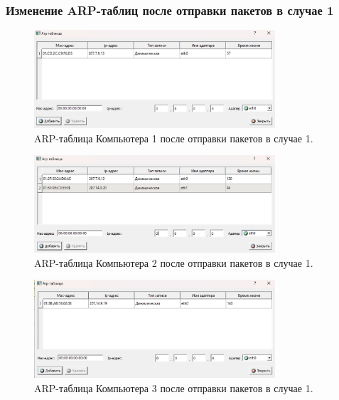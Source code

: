 \documentclass[12pt,onecolumn]{article}
\begin{document}
\subsubsection{Изменение ARP-таблиц после отправки пакетов в случае 1}
\begin{figure}[H]
  \centering
  \includegraphics[width=0.8\textwidth]{image/part3/arp-1-1.png}
  \caption{ARP-таблица Компьютера 1 после отправки пакетов в случае 1.}
\end{figure}
\begin{figure}[H]
  \centering
  \includegraphics[width=0.8\textwidth]{image/part3/arp-1-2.png}
  \caption{ARP-таблица Компьютера 2 после отправки пакетов в случае 1.}
\end{figure}
\begin{figure}[H]
  \centering
  \includegraphics[width=0.8\textwidth]{image/part3/arp-1-3.png}
  \caption{ARP-таблица Компьютера 3 после отправки пакетов в случае 1.}
\end{figure}
\end{document}
